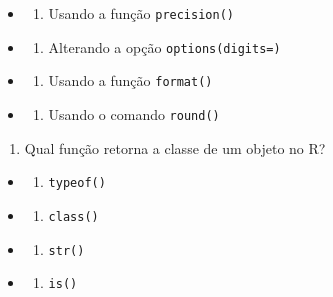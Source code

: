 \documentclass[
]{book}
\providecommand{\tightlist}{%
  \setlength{\itemsep}{0pt}\setlength{\parskip}{0pt}}
\begin{document}
\begin{itemize}
\tightlist
\item
  \begin{enumerate}
  \def\labelenumi{\alph{enumi})}
  \tightlist
  \item
    Usando a função \texttt{precision()}
  \end{enumerate}
\item
  \begin{enumerate}
  \def\labelenumi{\alph{enumi})}
  \setcounter{enumi}{1}
  \tightlist
  \item
    Alterando a opção \texttt{options(digits=)}
  \end{enumerate}
\item
  \begin{enumerate}
  \def\labelenumi{\alph{enumi})}
  \setcounter{enumi}{2}
  \tightlist
  \item
    Usando a função \texttt{format()}
  \end{enumerate}
\item
  \begin{enumerate}
  \def\labelenumi{\alph{enumi})}
  \setcounter{enumi}{3}
  \tightlist
  \item
    Usando o comando \texttt{round()}
  \end{enumerate}
\end{itemize}

\begin{enumerate}
\def\labelenumi{\arabic{enumi}.}
\setcounter{enumi}{9}
\tightlist
\item
  Qual função retorna a classe de um objeto no R?
\end{enumerate}

\begin{itemize}
\tightlist
\item
  \begin{enumerate}
  \def\labelenumi{\alph{enumi})}
  \tightlist
  \item
    \texttt{typeof()}
  \end{enumerate}
\item
  \begin{enumerate}
  \def\labelenumi{\alph{enumi})}
  \setcounter{enumi}{1}
  \tightlist
  \item
    \texttt{class()}
  \end{enumerate}
\item
  \begin{enumerate}
  \def\labelenumi{\alph{enumi})}
  \setcounter{enumi}{2}
  \tightlist
  \item
    \texttt{str()}
  \end{enumerate}
\item
  \begin{enumerate}
  \def\labelenumi{\alph{enumi})}
  \setcounter{enumi}{3}
  \tightlist
  \item
    \texttt{is()}
  \end{enumerate}
\end{itemize}
\end{document}
